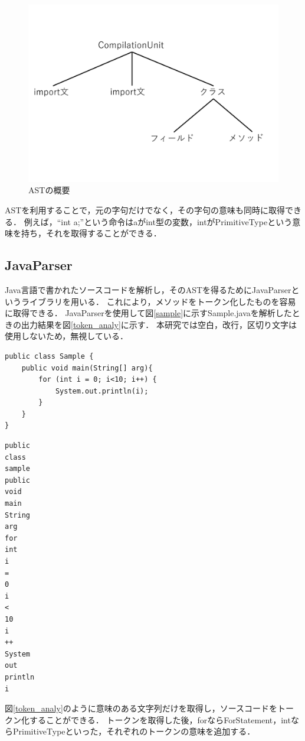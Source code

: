 \documentclass{thesis}
\begin{document}
\begin{figure}[H]
	\centering
	\includegraphics[scale=0.34]{./image/ast_image.pdf}
	\caption{ASTの概要}
	\label{fig:抽象構文木}
\end{figure}


ASTを利用することで，元の字句だけでなく，その字句の意味も同時に取得できる．
例えば，``int a;''という命令はaがint型の変数，intがPrimitiveTypeという意味を持ち，それを取得することができる．


\subsection{JavaParser}
Java言語で書かれたソースコードを解析し，そのASTを得るためにJavaParser\cite{JavaParser}というライブラリを用いる．
これにより，メソッドをトークン化したものを容易に取得できる．
JavaParserを使用して図\ref{sample}に示すSample.javaを解析したときの出力結果を図\ref{token_analy}に示す．
本研究では空白，改行，区切り文字は使用しないため，無視している．

\begin{lstlisting}[caption=Sample.java,label=sample]
public class Sample {
	public void main(String[] arg){
		for (int i = 0; i<10; i++) {
			System.out.println(i);
		}
	}
}
\end{lstlisting}


\begin{lstlisting}[caption=出力結果,label=token_analy]
public
class
sample
public
void
main
String
arg
for
int
i
=
0
i
<
10
i
++
System
out
println
i
\end{lstlisting}
図\ref{token_analy}のように意味のある文字列だけを取得し，ソースコードをトークン化することができる．
トークンを取得した後，forならForStatement，intならPrimitiveTypeといった，それぞれのトークンの意味を追加する．
\end{document}
